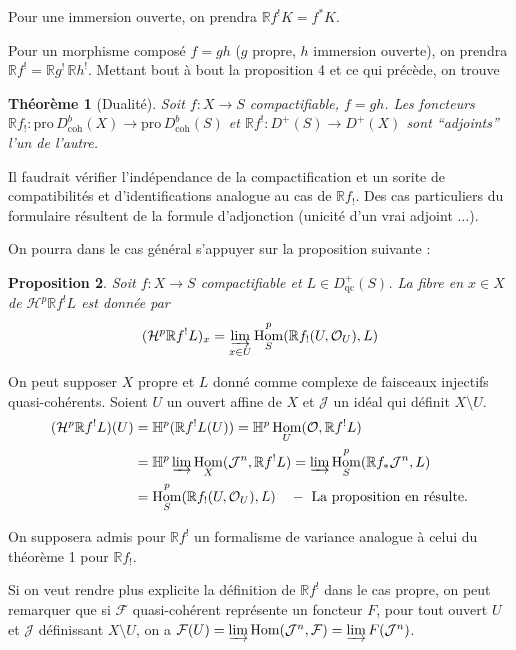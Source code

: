 \documentclass[12pt]{amsart}
\theoremstyle{plain}
\newtheorem{prop}{Proposition}[section]
\newtheorem{thm}[prop]{Théorème}
\theoremstyle{definition}
\DeclareMathOperator{\Hom}{Hom}
\newcommand{\Pro}{\text{pro}\,}
\newcommand{\coh}{\text{coh}}
\newcommand{\cF}{\mathcal{F}}
\newcommand{\cH}{\mathcal{H}}
\newcommand{\cJ}{\mathcal{J}}
\newcommand{\cO}{\mathcal{O}}
\newcommand{\cDb}{D^{b}}
\newcommand{\cD}{D}
\newcommand{\bH}{\mathbb{H}}
\newcommand{\bR}{\mathbb{R}}
\begin{document}
Pour une immersion ouverte, on prendra $\bR f^{!}K = f^{*}K$.

Pour un morphisme compos\'e $f = gh$ ($g$ propre, $h$ immersion ouverte), on prendra $\bR f^{!} = \bR g^{!}\,\bR h^{!}$. Mettant bout \`a bout la proposition 4 et ce qui pr\'ec\`ede, on trouve

\begin{thm}[Dualit\'e]
Soit $f: X \to S$ compactifiable, $f = gh$. Les foncteurs $\bR f_{!}: \Pro\cDb_{\coh}(X) \to \Pro\cDb_{\coh}(S)$ et $\bR f^{!}: \cD^{+}(S) \to \cD^{+}(X)$ sont ``adjoints'' l'un de l'autre.
\end{thm}

Il faudrait v\'erifier l'ind\'ependance de la compactification et un sorite de compatibilit\'es et d'identifications analogue au cas de $\bR f_{!}$. Des cas particuliers du formulaire r\'esultent de la formule d'adjonction (unicit\'e d'un vrai adjoint $\ldots$).

On pourra dans le cas g\'en\'eral s'appuyer sur la proposition suivante :

\begin{prop}
Soit $f: X \to S$ compactifiable et $L \in \cD^{+}_{\text{qc}}(S)$. La fibre en $x \in X$ de $\cH^{p}\bR f^{!}L$ est donn\'ee par
\[
(\cH^{p}\bR f^{!}L)_{x} = \varinjlim_{x \in U} \Hom^{p}_{S}(\bR f_{!}(U,\cO_{U}), L)
\]
\end{prop}

On peut supposer $X$ propre et $L$ donn\'e comme complexe de faisceaux injectifs quasi-coh\'erents. Soient $U$ un ouvert affine de $X$ et $\cJ$ un id\'eal qui d\'efinit $X \setminus U$.
\begin{align*}
(\cH^{p}\bR f^{!}L)(U) &= \bH^{p}(\bR f^{!}L(U)) = \bH^{p}\Hom_{U}(\cO, \bR f^{!}L) \\
&= \bH^{p}\varinjlim \Hom_{X}(\cJ^{n}, \bR f^{!}L) = \varinjlim \Hom^{p}_{S}(\bR f_{*}\cJ^{n}, L) \\
&= \Hom^{p}_{S}(\bR f_{!}(U,\cO_{U}), L) \quad - \text{ La proposition en r\'esulte.}
\end{align*}

On supposera admis pour $\bR f^{!}$ un formalisme de variance analogue \`a celui du th\'eor\`eme 1 pour $\bR f_{!}$.

Si on veut rendre plus explicite la d\'efinition de $\bR f^{!}$ dans le cas propre, on peut remarquer que si $\cF$ quasi-coh\'erent repr\'esente un foncteur $F$, pour tout ouvert $U$ et $\cJ$ d\'efinissant $X \setminus U$, on a $\cF(U) = \varinjlim \Hom(\cJ^{n}, \cF) = \varinjlim F(\cJ^{n})$.
\end{document}
